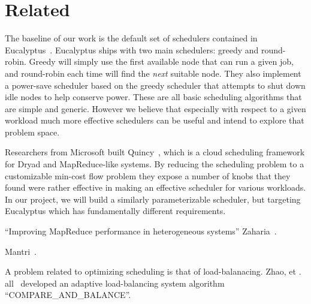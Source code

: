 \section{Related}



The baseline of our work is the default set of schedulers contained in
Eucalyptus~\cite{Eucalyptus}.  Eucalyptus ships with two main schedulers: greedy
and round-robin.  Greedy will simply use the first available node that can run a
given job, and round-robin each time will find the \emph{next} suitable node.
They also implement a power-save scheduler based on the greedy scheduler that
attempts to shut down idle nodes to help conserve power.  These are all
basic scheduling algorithms that are simple and generic.  However we believe
that especially with respect to a given workload much more effective schedulers
can be useful and intend to explore that problem space.

Researchers from Microsoft built Quincy~\cite{Quincy}, which is a cloud
scheduling framework for Dryad and MapReduce-like systems.  By reducing the
scheduling problem to a customizable min-cost flow problem they expose a number
of knobs that they found were rather effective in making an effective scheduler
for various workloads.  In our project, we will build a similarly
parameterizable scheduler, but targeting Eucalyptus which has fundamentally
different requirements.

``Improving MapReduce performance in heterogeneous systems'' Zaharia~\cite{Zaharia}.

Mantri~\cite{Mantri}.

A problem related to optimizing scheduling is that of load-balanacing.  Zhao, et
. all~\cite{Zhao} developed an adaptive load-balancing system algorithm
``COMPARE\_AND\_BALANCE''.
